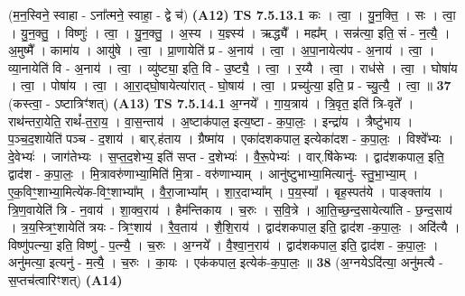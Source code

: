 \documentclass[17pt]{extarticle}
\begin{document}
                  \newline
                      (म॒न॒स्विने॒ स्वाहा - ऽना᳚त्मने॒ स्वाहा॒ - द्वे च॑)  \textbf{(A12)} \newline \newline
                                \textbf{ TS 7.5.13.1} \newline
                  कः । त्वा॒ । यु॒न॒क्ति॒ । सः । त्वा॒ । यु॒न॒क्तु॒ । विष्णुः॑ । त्वा॒ । यु॒न॒क्तु॒ । अ॒स्य । य॒ज्ञ्स्य॑ । ऋद्ध्यै᳚ । मह्य᳚म् । सन्न॑त्या॒ इति॒ सं - न॒त्यै॒ । अ॒मुष्मै᳚ । कामा॑य । आयु॑षे । त्वा॒ । प्रा॒णायेति॑ प्र - अ॒नाय॑ । त्वा॒ । अ॒पा॒नायेत्य॑प - अ॒नाय॑ । त्वा॒ । व्या॒नायेति॑ वि - अ॒नाय॑ । त्वा॒ । व्यु॑ष्ट्या॒ इति॒ वि - उ॒ष्ट्यै॒ । त्वा॒ । र॒य्यै । त्वा॒ । राध॑से । त्वा॒ । घोषा॑य । त्वा॒ । पोषा॑य । त्वा॒ । आ॒रा॒द्घो॒षायेत्या॑रात् - घो॒षाय॑ । त्वा॒ । प्रच्यु॑त्या॒ इति॒ प्र - च्यु॒त्यै॒ । त्वा॒ ॥ \textbf{  37} \newline
                  \newline
                      (कस्त्वा॒ - ऽष्टात्रिꣳ॑शत्)  \textbf{(A13)} \newline \newline
                                \textbf{ TS 7.5.14.1} \newline
                  अ॒ग्नये᳚ । गा॒य॒त्राय॑ । त्रि॒वृत॒ इति॑ त्रि-वृते᳚ । राथ॑न्तरा॒येति॒ राथं᳚-त॒रा॒य॒ । वा॒स॒न्ताय॑ । अ॒ष्टाक॑पाल॒ इत्य॒ष्टा - क॒पा॒लः॒ । इन्द्रा॑य । त्रैष्टु॑भाय । प॒ञ्च॒द॒शायेति॑ पञ्च - द॒शाय॑ । बार्.ह॑ताय । ग्रैष्मा॑य । एका॑दशकपाल॒ इत्येका॑दश - क॒पा॒लः॒ । विश्वे᳚भ्यः । दे॒वेभ्यः॑ । जाग॑तेभ्यः । स॒प्त॒द॒शेभ्य॒ इति॑ सप्त - द॒शेभ्यः॑ । वै॒रू॒पेभ्यः॑ । वार्.षि॑केभ्यः । द्वाद॑शकपाल॒ इति॒ द्वाद॑श - क॒पा॒लः॒ । मि॒त्रावरु॑णाभ्या॒मिति॑ मि॒त्रा - वरु॑णाभ्याम् । आनु॑ष्टुभाभ्या॒मित्यानु॑- स्तु॒भा॒भ्या॒म् । ए॒क॒विꣳ॒॒शाभ्या॒मित्ये॑क-विꣳ॒॒शाभ्या᳚म् । वै॒रा॒जाभ्या᳚म् । शा॒र॒दाभ्या᳚म् । प॒य॒स्या᳚ । बृह॒स्पत॑ये । पाङ्क्ता॑य । त्रि॒ण॒वायेति॑ त्रि - न॒वाय॑ । शा॒क्व॒राय॑ । हैम॑न्तिकाय । च॒रुः । स॒वि॒त्रे । आ॒ति॒च्छ॒न्द॒सायेत्या॑ति - छ॒न्द॒साय॑ । त्र॒य॒स्त्रिꣳ॒॒शायेति॑ त्रयः - त्रिꣳ॒॒शाय॑ । रै॒व॒ताय॑ । शै॒शि॒राय॑ । द्वाद॑शकपाल॒ इति॒ द्वाद॑श -क॒पा॒लः॒ । अदि॑त्यै । विष्णु॑पत्न्या॒ इति॒ विष्णु॑ - प॒त्न्यै॒ । च॒रुः । अ॒ग्नये᳚ । वै॒श्वा॒न॒राय॑ । द्वाद॑शकपाल॒ इति॒ द्वाद॑श - क॒पा॒लः॒ । अनु॑मत्या॒ इत्यनु॑ - म॒त्यै॒ । च॒रुः । का॒यः । एक॑कपाल॒ इत्येक॑-क॒पा॒लः॒ ॥ \textbf{  38} \newline
                  \newline
                      (अ॒ग्नयेऽदि॑त्या॒ अनु॑मत्यै - स॒प्तच॑त्वारिꣳशत्)  \textbf{(A14)} \newline \newline
\end{document}
